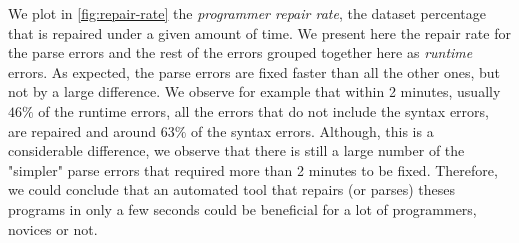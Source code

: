 We plot in \autoref{fig:repair-rate} the \emph{programmer repair rate}, \ie the
dataset percentage that is repaired under a given amount of time. We present
here the repair rate for the parse errors and the rest of the errors grouped
together here as \emph{runtime} errors. As expected, the parse errors are fixed
faster than all the other ones, but not by a large difference. We observe for
example that within 2 minutes, usually $46\%$ of the runtime errors, \ie all the
errors that do not include the syntax errors, are repaired and around $63\%$ of
the syntax errors. Although, this is a considerable difference, we observe that
there is still a large number of the "simpler" parse errors that required more
than 2 minutes to be fixed. Therefore, we could conclude that an automated tool
that repairs (or parses) theses programs in only a few seconds could be
beneficial for a lot of programmers, novices or not.

